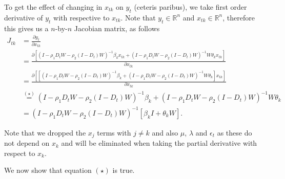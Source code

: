 \documentclass[11pt,a4paper]{amsart}
\theoremstyle{plain}
\theoremstyle{definition}
\begin{document}
To get the effect of changing in $x_{tk}$ on $y_{t}$ (ceteris paribus), we take first order derivative of $y_{t}$ with respective to $x_{tk}$. Note that $y_{t} \in \mathbb{R}^{n}$ and $x_{tk} \in \mathbb{R}^{n}$, therefore this gives us a $n$-by-$n$ Jacobian matrix, as follows
\begin{equation}
	\begin{aligned}
			J_{tk} &= \frac{\partial y_{t}}{\partial x_{tk}} \\
		&= \frac{\partial [ (I-\rho_{1}D_{t}W-\rho_{2}(I-D_{t})W)^{-1}\beta_{k}x_{tk} + (I-\rho_{1}D_{t}W-\rho_{2}(I-D_{t})W)^{-1}W \theta_{k}x_{tk}]}{\partial x_{tk}} \\
		&=  \frac{\partial [[ (I-\rho_{1}D_{t}W-\rho_{2}(I-D_{t})W)^{-1}\beta_{k} + (I-\rho_{1}D_{t}W-\rho_{2}(I-D_{t})W)^{-1}W \theta_{k}]x_{tk}]}{\partial x_{tk}} \\
		&\stackrel{(\star)}{=} (I-\rho_{1}D_{t}W-\rho_{2}(I-D_{t})W)^{-1}\beta_{k} + (I-\rho_{1}D_{t}W-\rho_{2}(I-D_{t})W)^{-1}W \theta_{k} \\
		&= (I-\rho_{1}D_{t}W-\rho_{2}(I-D_{t})W)^{-1}[\beta_{k} I + \theta_{k} W].
	\end{aligned}
\end{equation}

Note that we dropped the $x_{j}$ terms with $j \ne k$ and also $\mu$, $\lambda$ and $\epsilon_{t}$ as these do not depend on $x_{k}$ and will be eliminated when taking the partial derivative with respect to $x_{k}$. 

We now show that equation $(\star)$ is true. 
\end{document}
